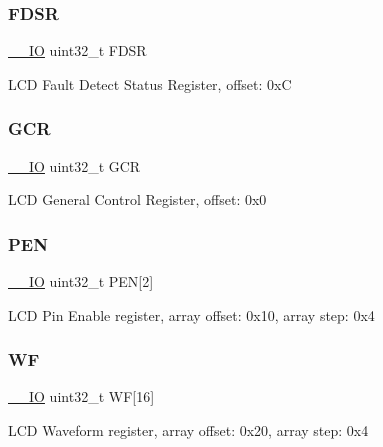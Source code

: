 \subsubsection{\texorpdfstring{FDSR}{FDSR}}
{\footnotesize\ttfamily \mbox{\hyperlink{core__cm0plus_8h_aec43007d9998a0a0e01faede4133d6be}{\+\_\+\+\_\+\+IO}} uint32\+\_\+t F\+D\+SR}

L\+CD Fault Detect Status Register, offset\+: 0xC \mbox{\label{struct_l_c_d___type_aae092d9d07574afe1fbc79c8bf7f7c19}} 
\subsubsection{\texorpdfstring{GCR}{GCR}}
{\footnotesize\ttfamily \mbox{\hyperlink{core__cm0plus_8h_aec43007d9998a0a0e01faede4133d6be}{\+\_\+\+\_\+\+IO}} uint32\+\_\+t G\+CR}

L\+CD General Control Register, offset\+: 0x0 \mbox{\label{struct_l_c_d___type_aad6a2a460a8c1f3dc80dcf4b62535de7}} 
\subsubsection{\texorpdfstring{PEN}{PEN}}
{\footnotesize\ttfamily \mbox{\hyperlink{core__cm0plus_8h_aec43007d9998a0a0e01faede4133d6be}{\+\_\+\+\_\+\+IO}} uint32\+\_\+t P\+EN\mbox{[}2\mbox{]}}

L\+CD Pin Enable register, array offset\+: 0x10, array step\+: 0x4 \mbox{\label{struct_l_c_d___type_a41cb7fd96eed5cdaed3bb04468d3e4dc}} 
\subsubsection{\texorpdfstring{WF}{WF}}
{\footnotesize\ttfamily \mbox{\hyperlink{core__cm0plus_8h_aec43007d9998a0a0e01faede4133d6be}{\+\_\+\+\_\+\+IO}} uint32\+\_\+t WF\mbox{[}16\mbox{]}}

L\+CD Waveform register, array offset\+: 0x20, array step\+: 0x4 \mbox{\label{struct_l_c_d___type_af794dc38bc12d5df18f48d0c1cce9369}} 
